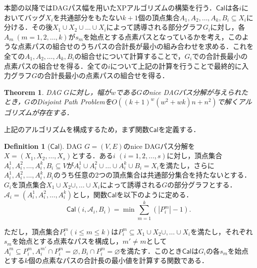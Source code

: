 \documentclass[master]{kuisthesis}		%
\theoremstyle{plain}
\newtheorem{theorem}{Theorem}
\theoremstyle{definition}
\newtheorem{definition*}{Definition}
\begin{document}
本節の以降ではDAGパス幅を用いたXPアルゴリズムの構築を行う．$\mathsf{Cal}$は各$i$においてバッグ$X_i$を共通部分をもたない$k+1$個の頂点集合$A_1, A_2, \dots, A_k, B_i \subseteq X_i$に分ける．その後$X_1 \cup X_2 \cup \dots \cup X_i$によって誘導される部分グラフ$G_i$に対し，各$A_m\ (m=1, 2, \dots, k)$が$s_m$を始点とする点素パスとなっているかを考え，このような点素パスの組合せのうちパスの合計長が最小の組み合わせを求める．これを全ての$A_1, A_2, \dots, A_k, B_i$の組合せについて計算することで，$G_i$での合計長最小の点素パスの組合せを得る．全ての$i$について上記の計算を行うことで最終的に入力グラフ$G$の合計長最小の点素パスの組合せを得る．

\begin{theorem}
    DAG $G$に対し，幅が$w$である$G$のnice DAGパス分解が与えられたとき，$G$のDisjoint Path Problemを$O((k+1)^w(w^2+wk)n+n^2)$で解くアルゴリズムが存在する．
\end{theorem}

上記のアルゴリズムを構成するため，まず関数$\mathsf{Cal}$を定義する．

\begin{definition*}[$\mathsf{Cal}$]
    DAG $G=(V, E)$のnice DAGパス分解を$X=(X_1, X_2, \dots , X_s)$とする．ある$i$ $(i=1, 2, \dots , s)$に対し，頂点集合$A^1_i, A^2_i, \dots , A^k_i, B_i \subseteq V$が$A^1_i \cup A^2_i \cup \dots \cup A^k_i \cup B_i = X_i$を満たし，さらに$A^1_i, A^2_i, \dots ,A^k_i, B_i$のうち任意の2つの頂点集合は共通部分集合を持たないとする．$G_i$を頂点集合$X_1 \cup X_2 \cup,  \dots \cup X_i$によって誘導される$G$の部分グラフとする．$\mathscr{A}_i=(A^1_i, A^2_i, \dots ,A^k_i)$とし，関数$\mathsf{Cal}$を以下のように定める．
    \begin{equation}\label{def_cal}
        \mathsf{Cal}(i, \mathscr{A}_i, B_i) = \min \sum_{m=1}^k (|P^m_i| - 1).
    \end{equation}


    ただし，頂点集合$P^m_i (i\leq m \leq k)$は$P^m_i \subseteq X_1 \cup X_2 \cup,  \dots \cup X_i$を満たし，それぞれ$s_m$を始点とする点素なパスを構成し，$m' \neq m$として$A^m_i \subseteq P^m_i, A^{m'}_i \cap P^m_i = \varnothing, B_i \cap P^m_i = \varnothing$を満たす．このとき$\mathsf{Cal}$は$G_i$の各$s_m$を始点とする$k$個の点素なパスの合計長の最小値を計算する関数である．
\end{definition*}
\end{document}

